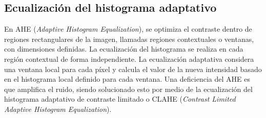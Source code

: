 \subsection{Ecualización del histograma adaptativo}
En AHE (\textit{Adaptive Histogram Equalization}), se optimiza el contraste dentro de regiones rectangulares de la imagen, llamadas
regiones contextuales o ventanas, con dimensiones definidas. La
ecualización del histograma se realiza en cada región contextual de forma independiente.
La ecualización adaptativa  considera una ventana local para cada píxel y calcula el valor de la nueva intensidad basado en el histograma local definido para  cada ventana. Una deficiencia del AHE es que amplifica el ruido, siendo solucionado esto por medio de la ecualización del histograma adaptativo de contraste limitado o CLAHE (\textit{Contrast Limited Adaptive Histogram Equalization}).
